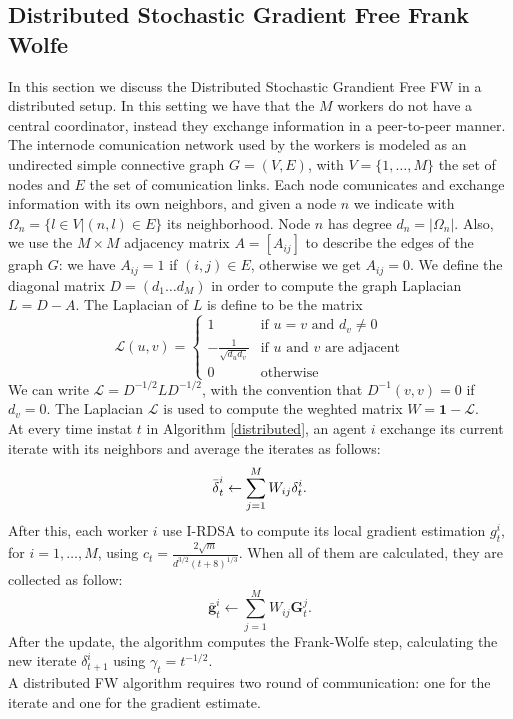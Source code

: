 \subsection{Distributed Stochastic Gradient Free Frank Wolfe}
In this section we discuss the Distributed Stochastic Grandient Free FW in a distributed setup. In this setting we have that the $M$ workers do not have a central coordinator, instead they exchange information in a peer-to-peer manner. The internode comunication network used by the workers is modeled as an undirected simple connective graph $G=(V,E)$, with $V=\{1, \dots, M\}$ the set of nodes and $E$ the set of comunication links. Each node comunicates and exchange information with its own neighbors, and given a node $n$ we indicate with $\Omega_n = \{l \in V | (n,l)\in E\}$ its neighborhood. Node $n$ has degree $d_n = |\Omega_n|$. Also, we use the $M \times M$ adjacency matrix $A=[A_{ij}]$ to describe the edges of the graph $G$: we have $A_{ij}=1$ if $(i,j) \in E$, otherwise we get $A_{ij}=0$. We define the diagonal matrix $D=(d_1 \dots d_M)$ in order to compute the graph Laplacian $L=D-A$. The Laplacian of $L$ is define to be the matrix
\[
\mathcal{L}(u,v)=
\begin{cases}
	1 & \text{if $u=v$ and }d_v\ne0 \\
	-\frac{1}{\sqrt{d_ud_v}} & \text{if $u$ and $v$ are adjacent}\\
	0 & \text{otherwise}
	
\end{cases}
\]
We can write $\mathcal{L} = D^{-1/2}LD^{-1/2}$, with the convention that $D^{-1}(v,v) = 0$ if $d_v=0$. The Laplacian $\mathcal{L}$ is used to compute the weghted matrix $W = \textbf{1}- \mathcal{L}$.\\
At every time instat $t$ in Algorithm \ref{distributed}, an agent $i$ exchange its current iterate with its neighbors and average the iterates as follows:
\[\bar{\text{\boldmath}\delta}_t^i \leftarrow \sum_{j=1}^{M} W_{ij}\text{\boldmath}\delta_t^i.\]
After this, each worker $i$ use I-RDSA to compute its local gradient estimation $g_t^i$, for $i= 1, \dots, M$, using $c_t = \frac{2\sqrt{m}}{d^{3/2}(t+8)^{1/3}}$. When all of them are calculated, they are collected as follow:
\[ \bar{\textbf{g}}_t^i \leftarrow \sum_{j=1}^{M} W_{ij}\textbf{G}_t^j.\]
After the update, the algorithm computes the Frank-Wolfe step, calculating the new iterate \boldmath$\delta_{t+1}^i$ using $\gamma_t= t^{-1/2}$.\\
A distributed FW algorithm requires two round of communication: one for the iterate and one for the gradient estimate.\\

